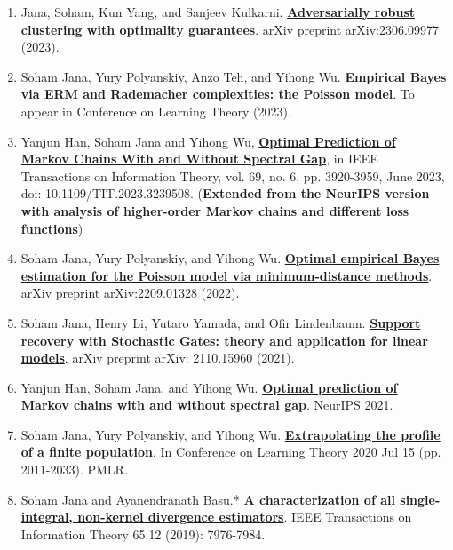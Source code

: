 \documentclass[letterpaper,11pt,oneside]{article}
\theoremstyle{definition}
\begin{document}
	\begin{enumerate}
		

		\item Jana, Soham, Kun Yang, and Sanjeev Kulkarni. \href{https://arxiv.org/abs/2306.09977}{\bf Adversarially robust clustering with optimality guarantees}. arXiv preprint arXiv:2306.09977 (2023).
		
		\item Soham Jana, Yury Polyanskiy, Anzo Teh, and Yihong Wu. {\bf Empirical Bayes via ERM and Rademacher complexities: the Poisson model}. To appear in Conference on Learning Theory (2023).
		
		
		\item Yanjun Han, Soham Jana and Yihong Wu, \href{https://ieeexplore.ieee.org/abstract/document/10028667}{\bf Optimal Prediction of Markov Chains With and Without Spectral Gap}, in IEEE Transactions on Information Theory, vol. 69, no. 6, pp. 3920-3959, June 2023, doi: 10.1109/TIT.2023.3239508. (\textbf{Extended from the NeurIPS version with analysis of higher-order Markov chains and different loss functions})
		
		\item Soham Jana, Yury Polyanskiy, and Yihong Wu. \href{https://arxiv.org/abs/2209.01328}{\bf Optimal empirical Bayes estimation for the Poisson model via minimum-distance methods}. arXiv preprint arXiv:2209.01328 (2022).
		
		\item Soham Jana, Henry Li, Yutaro Yamada, and Ofir Lindenbaum. {\bf \href{https://arxiv.org/abs/2110.15960}{\bf Support recovery with Stochastic Gates: theory and application for linear models}}. arXiv preprint arXiv: 2110.15960 (2021).
		
		\item Yanjun Han, Soham Jana, and Yihong Wu. \href{https://arxiv.org/abs/2106.13947}{\bf Optimal prediction of Markov chains with and without spectral gap}. NeurIPS 2021.
		
		\item Soham Jana, Yury Polyanskiy, and Yihong Wu. \href{https://arxiv.org/abs/2005.10561}{\bf Extrapolating the profile of a finite population}. In Conference on Learning Theory 2020 Jul 15 (pp. 2011-2033). PMLR.
		
		\item Soham Jana and Ayanendranath Basu.* \href{https://janasoham.github.io/files/bregman_charac.pdf}{\bf A characterization of all single-integral, non-kernel divergence estimators}. IEEE Transactions on Information Theory 65.12 (2019): 7976-7984.
		
	\end{enumerate}
\end{document}
